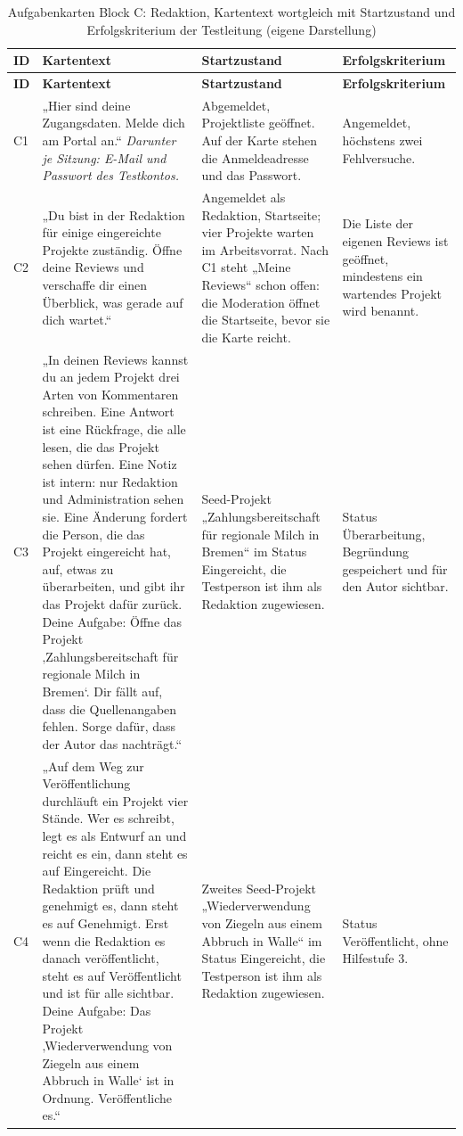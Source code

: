 \begingroup
\scriptsize
\setlength{\tabcolsep}{3pt}
\renewcommand{\arraystretch}{1.12}
\setlength{\LTcapwidth}{\textwidth}
\begin{longtable}{@{}L{0.6cm}L{6.1cm}L{3.8cm}L{4.2cm}@{}}
	\caption[Aufgabenkarten Block C: Redaktion]{Aufgabenkarten Block C: Redaktion, Kartentext wortgleich mit Startzustand und Erfolgskriterium der Testleitung (eigene Darstellung)}
	\label{tab:karten-c}\\
	\toprule
	\textbf{ID} & \textbf{Kartentext} & \textbf{Startzustand} & \textbf{Erfolgskriterium} \\
	\midrule
	\endfirsthead
	\toprule
	\textbf{ID} & \textbf{Kartentext} & \textbf{Startzustand} & \textbf{Erfolgskriterium} \\
	\midrule
	\endhead
	\bottomrule
	\endfoot
	C1 & „Hier sind deine Zugangsdaten. Melde dich am Portal an.“ \newline \textit{Darunter je Sitzung: E-Mail und Passwort des Testkontos.} & Abgemeldet, Projektliste geöffnet. Auf der Karte stehen die Anmeldeadresse und das Passwort. & Angemeldet, höchstens zwei Fehlversuche. \\
	C2 & „Du bist in der Redaktion für einige eingereichte Projekte zuständig. Öffne deine Reviews und verschaffe dir einen Überblick, was gerade auf dich wartet.“ & Angemeldet als Redaktion, Startseite; vier Projekte warten im Arbeitsvorrat. Nach C1 steht „Meine Reviews“ schon offen: die Moderation öffnet die Startseite, bevor sie die Karte reicht. & Die Liste der eigenen Reviews ist geöffnet, mindestens ein wartendes Projekt wird benannt. \\
	C3 & „In deinen Reviews kannst du an jedem Projekt drei Arten von Kommentaren schreiben. Eine Antwort ist eine Rückfrage, die alle lesen, die das Projekt sehen dürfen. Eine Notiz ist intern: nur Redaktion und Administration sehen sie. Eine Änderung fordert die Person, die das Projekt eingereicht hat, auf, etwas zu überarbeiten, und gibt ihr das Projekt dafür zurück. Deine Aufgabe: Öffne das Projekt ‚Zahlungsbereitschaft für regionale Milch in Bremen‘. Dir fällt auf, dass die Quellenangaben fehlen. Sorge dafür, dass der Autor das nachträgt.“ & Seed-Projekt „Zahlungsbereitschaft für regionale Milch in Bremen“ im Status Eingereicht, die Testperson ist ihm als Redaktion zugewiesen. & Status Überarbeitung, Begründung gespeichert und für den Autor sichtbar. \\
	C4 & „Auf dem Weg zur Veröffentlichung durchläuft ein Projekt vier Stände. Wer es schreibt, legt es als Entwurf an und reicht es ein, dann steht es auf Eingereicht. Die Redaktion prüft und genehmigt es, dann steht es auf Genehmigt. Erst wenn die Redaktion es danach veröffentlicht, steht es auf Veröffentlicht und ist für alle sichtbar. Deine Aufgabe: Das Projekt ‚Wiederverwendung von Ziegeln aus einem Abbruch in Walle‘ ist in Ordnung. Veröffentliche es.“ & Zweites Seed-Projekt „Wiederverwendung von Ziegeln aus einem Abbruch in Walle“ im Status Eingereicht, die Testperson ist ihm als Redaktion zugewiesen. & Status Veröffentlicht, ohne Hilfestufe 3. \\

\end{longtable}
